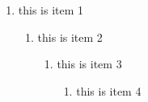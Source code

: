 \documentclass[14pt]{extarticle}
\begin{document}
\begin{enumerate}
\item this is item 1
  \begin{enumerate}
  \item this is item 2
    \begin{enumerate}
    \item this is item 3
      \begin{enumerate}
      \item this is item 4
      \end{enumerate}
    \end{enumerate}
  \end{enumerate}
\end{enumerate}
\end{document}
